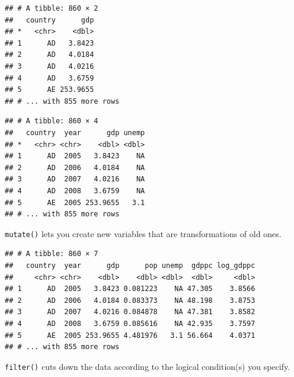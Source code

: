 \documentclass[12pt,oneside,openany]{book}
\newenvironment{Shaded}{\begin{snugshade}}{\end{snugshade}}
\newcommand{\KeywordTok}[1]{\textcolor[rgb]{0.13,0.29,0.53}{\textbf{{#1}}}}
\newcommand{\DataTypeTok}[1]{\textcolor[rgb]{0.13,0.29,0.53}{{#1}}}
\newcommand{\DecValTok}[1]{\textcolor[rgb]{0.00,0.00,0.81}{{#1}}}
\newcommand{\StringTok}[1]{\textcolor[rgb]{0.31,0.60,0.02}{{#1}}}
\newcommand{\NormalTok}[1]{{#1}}
\begin{document}
\begin{verbatim}
## # A tibble: 860 × 2
##   country      gdp
## *   <chr>    <dbl>
## 1      AD   3.8423
## 2      AD   4.0184
## 3      AD   4.0216
## 4      AD   3.6759
## 5      AE 253.9655
## # ... with 855 more rows
\end{verbatim}

\begin{Shaded}
\end{Shaded}

\begin{verbatim}
## # A tibble: 860 × 4
##   country  year      gdp unemp
## *   <chr> <chr>    <dbl> <dbl>
## 1      AD  2005   3.8423    NA
## 2      AD  2006   4.0184    NA
## 3      AD  2007   4.0216    NA
## 4      AD  2008   3.6759    NA
## 5      AE  2005 253.9655   3.1
## # ... with 855 more rows
\end{verbatim}

\texttt{mutate()} lets you create new variables that are transformations
of old ones.

\begin{Shaded}
\end{Shaded}

\begin{verbatim}
## # A tibble: 860 × 7
##   country  year      gdp      pop unemp  gdppc log_gdppc
##     <chr> <chr>    <dbl>    <dbl> <dbl>  <dbl>     <dbl>
## 1      AD  2005   3.8423 0.081223    NA 47.305    3.8566
## 2      AD  2006   4.0184 0.083373    NA 48.198    3.8753
## 3      AD  2007   4.0216 0.084878    NA 47.381    3.8582
## 4      AD  2008   3.6759 0.085616    NA 42.935    3.7597
## 5      AE  2005 253.9655 4.481976   3.1 56.664    4.0371
## # ... with 855 more rows
\end{verbatim}

\texttt{filter()} cuts down the data according to the logical
condition(s) you specify.

\begin{Shaded}
\end{Shaded}
\end{document}

